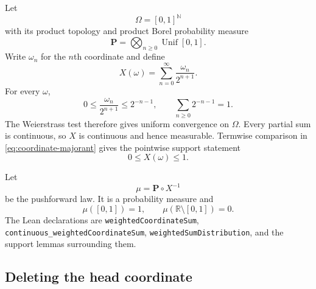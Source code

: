 \documentclass[11pt,oneside]{article}
\theoremstyle{definition}
\theoremstyle{remark}
\newcommand{\R}{\mathbb R}
\newcommand{\N}{\mathbb N}
\newcommand{\lean}[1]{\texttt{#1}}
\begin{document}
Let
\begin{equation}
 \Omega=[0,1]^{\N}
 \label{eq:sample-space}
\end{equation}
with its product topology and product Borel probability measure
\begin{equation}
 \mathbf P=\bigotimes_{n\ge0}\operatorname{Unif}[0,1].
 \label{eq:uniform-product}
\end{equation}
Write $\omega_n$ for the $n$th coordinate and define
\begin{equation}
 X(\omega)=\sum_{n=0}^{\infty}\frac{\omega_n}{2^{n+1}}.
 \label{eq:weighted-coordinate-sum}
\end{equation}
For every $\omega$,
\begin{equation}
 0\le \frac{\omega_n}{2^{n+1}}\le2^{-n-1},
 \qquad
 \sum_{n\ge0}2^{-n-1}=1.
 \label{eq:coordinate-majorant}
\end{equation}
The Weierstrass test therefore gives uniform convergence on $\Omega$.  Every partial sum is
continuous, so $X$ is continuous and hence measurable.  Termwise comparison in
\eqref{eq:coordinate-majorant} gives the pointwise support statement
\begin{equation}
 0\le X(\omega)\le1.
 \label{eq:X-support}
\end{equation}

Let
\begin{equation}
 \mu=\mathbf P\circ X^{-1}
 \label{eq:weighted-sum-law}
\end{equation}
be the pushforward law.  It is a probability measure and
\begin{equation}
 \mu([0,1])=1,
 \qquad
 \mu(\R\setminus[0,1])=0.
 \label{eq:law-support}
\end{equation}
The Lean declarations are \lean{weightedCoordinateSum},
\lean{continuous\_weightedCoordinateSum}, \lean{weightedSumDistribution}, and the support
lemmas surrounding them.

\subsection{Deleting the head coordinate}
\end{document}
